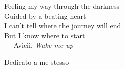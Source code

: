 \cleardoublepage
{}
\thispagestyle{empty}

\vspace*{3cm}

\begin{center}
    Feeling my way through the darkness\\
    Guided by a beating heart\\
    I can't tell where the journey will end\\
    But I know where to start \\ \medskip
    --- Avicii. \textit{Wake me up}
\end{center}

\medskip

\begin{center}
    Dedicato a me stesso
\end{center}
